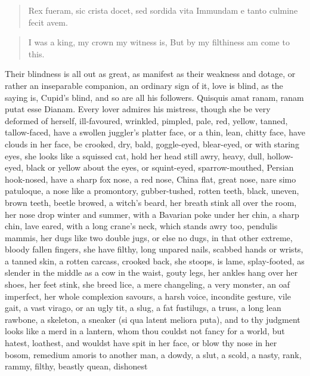 \begin{latin}
\begin{verse}
Rex fueram, sic crista docet, sed sordida vita
Immundam e tanto culmine fecit avem.
\end{verse}
\end{latin}
\translationrule%
\begin{verse}%
I was a king, my crown my witness is,
But by my filthiness am come to this.
\end{verse}%

Their blindness is all out as great, as manifest as their weakness and
dotage, or rather an inseparable companion, an ordinary sign of it,
love is blind, as the saying is, Cupid's blind, and so are all
his followers. Quisquis amat ranam, ranam putat esse Dianam. Every
lover admires his mistress, though she be very deformed of herself,
ill-favoured, wrinkled, pimpled, pale, red, yellow, tanned,
tallow-faced, have a swollen juggler's platter face, or a thin, lean,
chitty face, have clouds in her face, be crooked, dry, bald,
goggle-eyed, blear-eyed, or with staring eyes, she looks like a
squissed cat, hold her head still awry, heavy, dull, hollow-eyed, black
or yellow about the eyes, or squint-eyed, sparrow-mouthed, Persian
hook-nosed, have a sharp fox nose, a red nose, China flat, great nose,
nare simo patuloque, a nose like a promontory, gubber-tushed, rotten
teeth, black, uneven, brown teeth, beetle browed, a witch's beard, her
breath stink all over the room, her nose drop winter and summer, with a
Bavarian poke under her chin, a sharp chin, lave eared, with a long
crane's neck, which stands awry too, pendulis mammis, her dugs like two
double jugs, or else no dugs, in that other extreme, bloody fallen
fingers, she have filthy, long unpared nails, scabbed hands or wrists,
a tanned skin, a rotten carcass, crooked back, she stoops, is lame,
splay-footed, as slender in the middle as a cow in the waist, gouty
legs, her ankles hang over her shoes, her feet stink, she breed lice, a
mere changeling, a very monster, an oaf imperfect, her whole complexion
savours, a harsh voice, incondite gesture, vile gait, a vast virago, or
an ugly tit, a slug, a fat fustilugs, a truss, a long lean rawbone, a
skeleton, a sneaker (si qua latent meliora puta), and to thy judgment
looks like a merd in a lantern, whom thou couldst not fancy for a
world, but hatest, loathest, and wouldst have spit in her face, or blow
thy nose in her bosom, remedium amoris to another man, a dowdy, a slut,
a scold, a nasty, rank, rammy, filthy, beastly quean, dishonest
